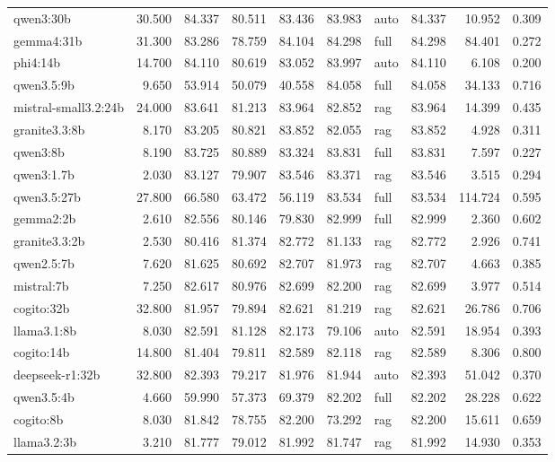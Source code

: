 \begin{tabular}{lrrrrrlrrr}
qwen3:30b & 30.500 & 84.337 & 80.511 & 83.436 & 83.983 & auto & 84.337 & 10.952 & 0.309 \\
gemma4:31b & 31.300 & 83.286 & 78.759 & 84.104 & 84.298 & full & 84.298 & 84.401 & 0.272 \\
phi4:14b & 14.700 & 84.110 & 80.619 & 83.052 & 83.997 & auto & 84.110 & 6.108 & 0.200 \\
qwen3.5:9b & 9.650 & 53.914 & 50.079 & 40.558 & 84.058 & full & 84.058 & 34.133 & 0.716 \\
mistral-small3.2:24b & 24.000 & 83.641 & 81.213 & 83.964 & 82.852 & rag & 83.964 & 14.399 & 0.435 \\
granite3.3:8b & 8.170 & 83.205 & 80.821 & 83.852 & 82.055 & rag & 83.852 & 4.928 & 0.311 \\
qwen3:8b & 8.190 & 83.725 & 80.889 & 83.324 & 83.831 & full & 83.831 & 7.597 & 0.227 \\
qwen3:1.7b & 2.030 & 83.127 & 79.907 & 83.546 & 83.371 & rag & 83.546 & 3.515 & 0.294 \\
qwen3.5:27b & 27.800 & 66.580 & 63.472 & 56.119 & 83.534 & full & 83.534 & 114.724 & 0.595 \\
gemma2:2b & 2.610 & 82.556 & 80.146 & 79.830 & 82.999 & full & 82.999 & 2.360 & 0.602 \\
granite3.3:2b & 2.530 & 80.416 & 81.374 & 82.772 & 81.133 & rag & 82.772 & 2.926 & 0.741 \\
qwen2.5:7b & 7.620 & 81.625 & 80.692 & 82.707 & 81.973 & rag & 82.707 & 4.663 & 0.385 \\
mistral:7b & 7.250 & 82.617 & 80.976 & 82.699 & 82.200 & rag & 82.699 & 3.977 & 0.514 \\
cogito:32b & 32.800 & 81.957 & 79.894 & 82.621 & 81.219 & rag & 82.621 & 26.786 & 0.706 \\
llama3.1:8b & 8.030 & 82.591 & 81.128 & 82.173 & 79.106 & auto & 82.591 & 18.954 & 0.393 \\
cogito:14b & 14.800 & 81.404 & 79.811 & 82.589 & 82.118 & rag & 82.589 & 8.306 & 0.800 \\
deepseek-r1:32b & 32.800 & 82.393 & 79.217 & 81.976 & 81.944 & auto & 82.393 & 51.042 & 0.370 \\
qwen3.5:4b & 4.660 & 59.990 & 57.373 & 69.379 & 82.202 & full & 82.202 & 28.228 & 0.622 \\
cogito:8b & 8.030 & 81.842 & 78.755 & 82.200 & 73.292 & rag & 82.200 & 15.611 & 0.659 \\
llama3.2:3b & 3.210 & 81.777 & 79.012 & 81.992 & 81.747 & rag & 81.992 & 14.930 & 0.353 \\

\end{tabular}
